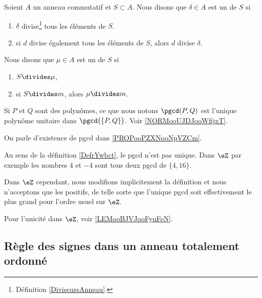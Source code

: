\begin{definition}          \label{DefrYwbct}
	Soient \( A\) un anneau commutatif et \( S\subset A\). Nous disons que \( \delta\in A\) est un  de \( S\) si
	\begin{enumerate}
		\item
		      \( \delta\) divise\footnote{Définition \ref{DiviseursAnneau}.} tous les éléments de \( S\).
		\item       \label{ITEMooVCKGooWDXZOj}
		      si \( d\) divise également tous les éléments de \( S\), alors \( d\) divise \( \delta\).
	\end{enumerate}
	Nous disons que \( \mu\in A\) est un  de \( S\) si
	\begin{enumerate}
		\item
		      \( S\divides \mu\),
		\item
		      si \( S\divides m\), alors \( \mu\divides m\).
	\end{enumerate}
	Si \( P\) et \( Q\) sont des polynômes, ce que nous notons \( \pgcd(P,Q)\) est l'unique polynôme unitaire dans \( \pgcd\big( \{ P,Q \} \big)\). Voir \ref{NORMooUJDJooWfijxT}.
\end{definition}

\begin{remark}\label{REMooExistenceUnicitePGCD}
	On parle d'existence de pgcd dans \ref{PROPooPZXNooNpVZCm}.

	Au sens de la définition \ref{DefrYwbct}, le pgcd n'est pas unique. Dans \( \eZ\) par exemple les nombres \( 4\) et \( -4\) sont tous deux pgcd de \( \{4,16  \}\).

	Dans \( \eZ\) cependant, nous modifions implicitement la définition et nous n'acceptons que les positifs, de telle sorte que l'unique pgcd soit effectivement le plus grand pour l'ordre usuel sur \( \eZ\).

	Pour l'unicité dans \( \eZ\), voir \ref{LEMooBJVJooFyuFeN}.
\end{remark}


\subsection{Règle des signes dans un anneau totalement ordonné}
\label{SUBooSignesAnnTotOrdonne}

